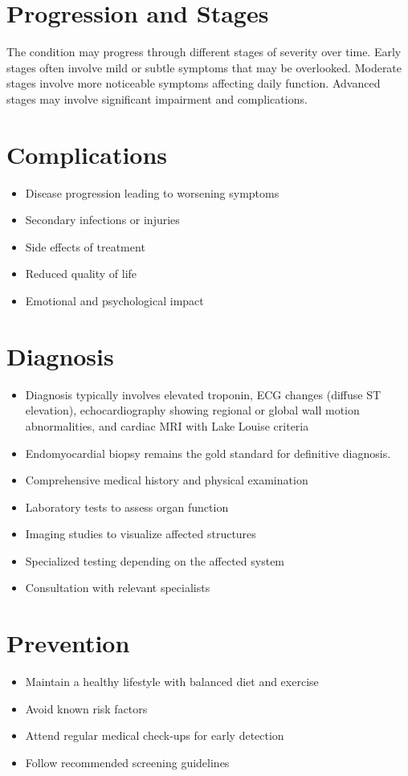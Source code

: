\section{Progression and Stages}
The condition may progress through different stages of severity over time. Early stages often involve mild or subtle symptoms that may be overlooked. Moderate stages involve more noticeable symptoms affecting daily function. Advanced stages may involve significant impairment and complications.
\section{Complications}
\begin{itemize}[noitemsep]
  \item Disease progression leading to worsening symptoms
  \item Secondary infections or injuries
  \item Side effects of treatment
  \item Reduced quality of life
  \item Emotional and psychological impact
\end{itemize}
\section{Diagnosis}
\begin{itemize}[noitemsep]
  \item Diagnosis typically involves elevated troponin, ECG changes (diffuse ST elevation), echocardiography showing regional or global wall motion abnormalities, and cardiac MRI with Lake Louise criteria
  \item Endomyocardial biopsy remains the gold standard for definitive diagnosis.
  \item Comprehensive medical history and physical examination
  \item Laboratory tests to assess organ function
  \item Imaging studies to visualize affected structures
  \item Specialized testing depending on the affected system
  \item Consultation with relevant specialists
\end{itemize}
\section{Prevention}
\begin{itemize}[noitemsep]
  \item Maintain a healthy lifestyle with balanced diet and exercise
  \item Avoid known risk factors
  \item Attend regular medical check-ups for early detection
  \item Follow recommended screening guidelines
\end{itemize}
